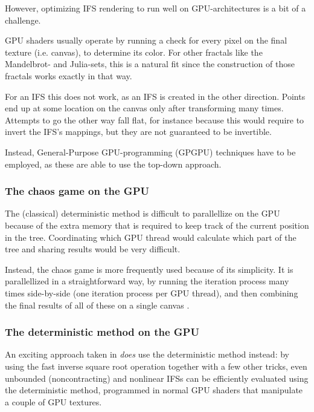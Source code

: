 \documentclass[11pt]{article}
\begin{document}
However, optimizing IFS rendering to run well on GPU-architectures is a bit of a challenge.

GPU shaders usually operate by running a check for every pixel on the final texture (i.e. canvas), to determine its color.
For other fractals like the Mandelbrot- and Julia-sets, this is a natural fit since the construction of those fractals works exactly in that way.

For an IFS this does not work, as an IFS is created in the other direction. Points end up at some location on the canvas only after transforming many times.
Attempts to go the other way fall flat, for instance because this would require to invert the IFS's mappings, but they are not guaranteed to be invertible.


Instead, General-Purpose GPU-programming (GPGPU) techniques have to be employed, as these are able to use the top-down approach.

\subsubsection{The chaos game on the GPU}
\label{sec:org7f3bd12}
\label{subsection:chaos_game_gpu}

The (classical) deterministic method is difficult to parallellize on the GPU because of the extra memory that is required to keep track of the current position in the tree.
Coordinating which GPU thread would calculate which part of the tree and sharing results would be very difficult.

Instead, the chaos game is more frequently used because of its simplicity. 
It is parallellized in a straightforward way, 
by running the iteration process many times side-by-side (one iteration process per GPU thread),
and then combining the final results of all of these on a single canvas \cite{green2005gpu}.

\subsubsection{The deterministic method on the GPU}
\label{sec:org77ffd1c}
\label{subsection:deterministic_gpu}

An exciting approach taken in \cite{lawlor2012gpu} \emph{does} use the deterministic method instead:
by using the fast inverse square root operation together with a few other tricks, 
even unbounded (noncontracting) and nonlinear IFSs can be efficiently
evaluated using the deterministic method, programmed in normal GPU shaders that manipulate a couple of GPU textures.
\end{document}
